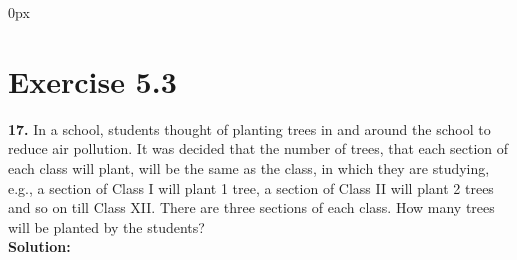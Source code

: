 \documentclass[journal,12pt,twocolumn]{IEEEtran}
\begin{document}
	\parindent 0px
	
	
	\vspace{3cm}
	
	\title{}
	\author{EE23BTECH11209 - K S Ballvardhan$^{*}$
	}
	\maketitle
	\newpage
	\bigskip
	
	
	
	\section*{Exercise 5.3}
	
	\noindent \textbf{17.} In a school, students thought of planting trees in and around the school to reduce air pollution. It was decided that the number of trees, that each section of each class will plant, will be the same as the class, in which they are studying, e.g., a section of Class I will plant 1 tree, a section of Class II will plant 2 trees and so on till Class XII. There are three sections of each class. How many trees will be planted by the students?\\
	
        \textbf {Solution: }
	
\end{document}
